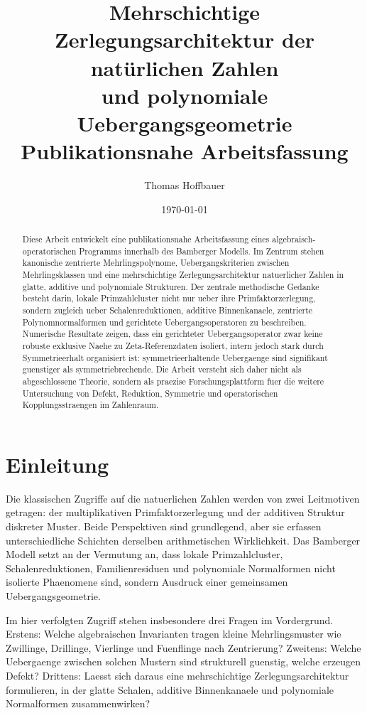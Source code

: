 \documentclass[11pt,a4paper]{article}
\title{Mehrschichtige Zerlegungsarchitektur der natürlichen Zahlen\\
und polynomiale Uebergangsgeometrie\\
\large Publikationsnahe Arbeitsfassung}
\author{Thomas Hoffbauer}
\date{\today}
\theoremstyle{definition}
\begin{document}
\maketitle

\begin{abstract}
Diese Arbeit entwickelt eine publikationsnahe Arbeitsfassung eines algebraisch-operatorischen Programms innerhalb des Bamberger Modells. Im Zentrum stehen kanonische zentrierte Mehrlingspolynome, Uebergangskriterien zwischen Mehrlingsklassen und eine mehrschichtige Zerlegungsarchitektur natuerlicher Zahlen in glatte, additive und polynomiale Strukturen. Der zentrale methodische Gedanke besteht darin, lokale Primzahlcluster nicht nur ueber ihre Primfaktorzerlegung, sondern zugleich ueber Schalenreduktionen, additive Binnenkanaele, zentrierte Polynomnormalformen und gerichtete Uebergangsoperatoren zu beschreiben. Numerische Resultate zeigen, dass ein gerichteter Uebergangsoperator zwar keine robuste exklusive Naehe zu Zeta-Referenzdaten isoliert, intern jedoch stark durch Symmetrieerhalt organisiert ist: symmetrieerhaltende Uebergaenge sind signifikant guenstiger als symmetriebrechende. Die Arbeit versteht sich daher nicht als abgeschlossene Theorie, sondern als praezise Forschungsplattform fuer die weitere Untersuchung von Defekt, Reduktion, Symmetrie und operatorischen Kopplungsstraengen im Zahlenraum.
\end{abstract}

\tableofcontents

\section{Einleitung}

Die klassischen Zugriffe auf die natuerlichen Zahlen werden von zwei Leitmotiven getragen: der multiplikativen Primfaktorzerlegung und der additiven Struktur diskreter Muster. Beide Perspektiven sind grundlegend, aber sie erfassen unterschiedliche Schichten derselben arithmetischen Wirklichkeit. Das Bamberger Modell setzt an der Vermutung an, dass lokale Primzahlcluster, Schalenreduktionen, Familienresiduen und polynomiale Normalformen nicht isolierte Phaenomene sind, sondern Ausdruck einer gemeinsamen Uebergangsgeometrie.

Im hier verfolgten Zugriff stehen insbesondere drei Fragen im Vordergrund. Erstens: Welche algebraischen Invarianten tragen kleine Mehrlingsmuster wie Zwillinge, Drillinge, Vierlinge und Fuenflinge nach Zentrierung? Zweitens: Welche Uebergaenge zwischen solchen Mustern sind strukturell guenstig, welche erzeugen Defekt? Drittens: Laesst sich daraus eine mehrschichtige Zerlegungsarchitektur formulieren, in der glatte Schalen, additive Binnenkanaele und polynomiale Normalformen zusammenwirken?
\end{document}
